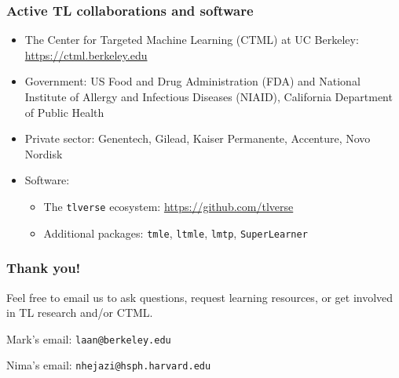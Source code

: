 \documentclass[t]{beamer}
\begin{document}
\begin{frame}
\frametitle{Active TL collaborations and software}
\begin{itemize}
\item The Center for Targeted Machine Learning (CTML) at UC Berkeley: \url{https://ctml.berkeley.edu}
\item Government: US Food and Drug Administration (FDA) and National Institute of Allergy and Infectious Diseases (NIAID), California Department of Public Health
\item Private sector: Genentech, Gilead, Kaiser Permanente, Accenture, Novo Nordisk
\item Software:
    \begin{itemize}
        \item The \texttt{tlverse} ecosystem: \url{https://github.com/tlverse}
        \item Additional packages: \texttt{tmle}, \texttt{ltmle}, \texttt{lmtp}, \texttt{SuperLearner}
    \end{itemize}
    \end{itemize}
\end{frame}

\begin{frame}
\frametitle{Thank you!}
\vspace{10pt}
Feel free to email us to ask questions, request learning resources, or get
involved in TL research and/or CTML.

\vspace{10pt}
Mark's email: \texttt{laan@berkeley.edu}

\vspace{10pt}
Nima's email: \texttt{nhejazi@hsph.harvard.edu}



\end{frame}

\appendix

\begin{frame}
\centering
{}
  \appendixname
\end{frame}
\end{document}
